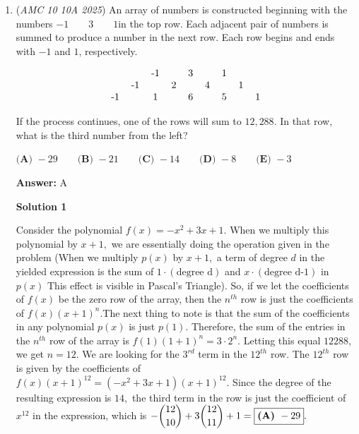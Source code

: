 \begin{enumerate}
 There are $2025$ polynomials like this, so the sum of roots would be $2025\cdot (- \frac{4}{3})$. Finding the harmonic mean, we get:

 
 \[\frac{1}{\frac{1}{4050} \cdot \frac{-4\cdot 2025}{3}} = \frac{1}{\frac{-2}{3}}\]

 Or $\boxed{\textbf{(B) }-\frac{3}{2}}$



	\item (\textit{AMC 10 10A 2025}) An array of numbers is constructed beginning with the numbers 
$-1\qquad3\qquad1$in the top row. Each adjacent pair of numbers is summed to produce a number in the next row. Each row begins and ends with 
$-1$ and $1$, respectively.


 
 \[\begin{tabular}{ccccccccc} &&-1&&3&&1&&\\ &-1&&2&&4&&1&\\ -1&&1&&6&&5&&1\\ \end{tabular}\]


 If the process continues, one of the rows will sum to $12,288$. In that row, what is the third number from the left?


 $\textbf{(A) } -29 \qquad\textbf{(B) } -21 \qquad\textbf{(C) } -14 \qquad\textbf{(D) } -8 \qquad\textbf{(E) } -3$

 \textbf{Answer: }A



\textbf{Solution 1}

Consider the polynomial $f(x) = -x^2+3x+1.$ When we multiply this polynomial by $x+1,$ we are essentially doing the operation given in the problem (When we multiply $p(x)$ by $x+1,$ a term of degree $d$ in the yielded expression is the sum of $1\cdot(\text{degree d})$ and $x\cdot(\text{degree d-1})$ in $p(x)$ This effect is visible in Pascal's Triangle). So, if we let the coefficients of $f(x)$ be the zero row of the array, then the $n^{th}$ row is just the coefficients of $f(x)(x+1)^n.$The next thing to note is that the sum of the coefficients in any polynomial $p(x)$ is just $p(1).$ Therefore, the sum of the entries in the $n^{th}$ row of the array is $f(1)(1+1)^n=3\cdot2^n.$ Letting this equal $12288,$ we get $n=12.$ We are looking for the $3^{rd}$ term in the $12^{th}$ row. The $12^{th}$ row is given by the coefficients of $f(x)(x+1)^{12}=(-x^2+3x+1)(x+1)^{12}.$ Since the degree of the resulting expression is $14,$ the third term in the row is just the coefficient of $x^{12}$ in the expression, which is $-\dbinom{12}{10}+3\dbinom{12}{11}+1=\boxed{\textbf{(A) }-29}.$





\end{enumerate}
